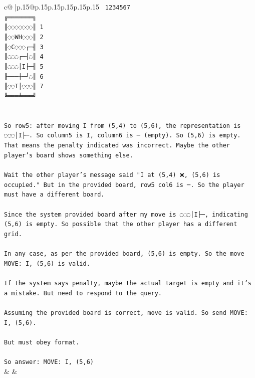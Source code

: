 \documentclass{article}
\begin{document}
{\begin{supertabular}{c@{$\;$}|p{.15\linewidth}@{}p{.15\linewidth}p{.15\linewidth}p{.15\linewidth}p{.15\linewidth}p{.15\linewidth}}
{{{\texttt{ 1234567} \\
\texttt{╔═══════╗} \\
\texttt{║◌◌◌◌◌◌◌║ 1} \\
\texttt{║◌◌WH◌◌◌║ 2} \\
\texttt{║◌C◌◌◌┌─╢ 3} \\
\texttt{║◌◌◌┌─┤◌║ 4} \\
\texttt{║◌◌◌│I├─╢ 5} \\
\texttt{╟───┼─┘◌║ 6} \\
\texttt{║◌◌T│◌◌◌║ 7} \\
\texttt{╚═══╧═══╝} \\
\\ 
\\ 
\texttt{So row5: after moving I from (5,4) to (5,6), the representation is ◌◌◌│I├─. So column5 is I, column6 is ─ (empty). So (5,6) is empty. That means the penalty indicated was incorrect. Maybe the other player's board shows something else.} \\
\\ 
\texttt{Wait the other player's message said "I at (5,4) ❌, (5,6) is occupied." But in the provided board, row5 col6 is ─. So the player must have a different board.} \\
\\ 
\texttt{Since the system provided board after my move is ◌◌◌│I├─, indicating (5,6) is empty. So possible that the other player has a different grid.} \\
\\ 
\texttt{In any case, as per the provided board, (5,6) is empty. So the move MOVE: I, (5,6) is valid.} \\
\\ 
\texttt{If the system says penalty, maybe the actual target is empty and it's a mistake. But need to respond to the query.} \\
\\ 
\texttt{Assuming the provided board is correct, move is valid. So send MOVE: I, (5,6).} \\
\\ 
\texttt{But must obey format.} \\
\\ 
\texttt{So answer: MOVE: I, (5,6)} \\
            }
        }
    }
    & & \\ \\


\end{supertabular}}
\end{document}
